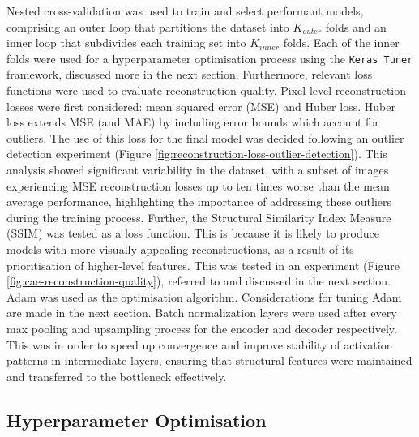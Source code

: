 \documentclass[10pt,twocolumn,letterpaper]{article}
\begin{document}
Nested cross-validation was used to train and select performant models, comprising an outer loop that partitions the dataset into $K_{outer}$ folds and an inner loop that subdivides each training set into $K_{inner}$ folds. Each of the inner folds were used for a hyperparameter optimisation process using the \texttt{Keras Tuner} framework, discussed more in the next section. Furthermore, relevant loss functions were used to evaluate reconstruction quality. Pixel-level reconstruction losses were first considered: mean squared error (MSE) and Huber loss. Huber loss extends MSE (and MAE) by including error bounds which account for outliers. The use of this loss for the final model was decided following an outlier detection experiment (Figure \ref{fig:reconstruction-loss-outlier-detection}). This analysis showed significant variability in the dataset, with a subset of images experiencing MSE reconstruction losses up to ten times worse than the mean average performance, highlighting the importance of addressing these outliers during the training process. Further, the Structural Similarity Index Measure (SSIM) was tested as a loss function. This is because it is likely to produce models with more visually appealing reconstructions, as a result of its prioritisation of higher-level features. This was tested in an experiment (Figure \ref{fig:cae-reconstruction-quality}), referred to and discussed in the next section. Adam was used as the optimisation algorithm. Considerations for tuning Adam are made in the next section. Batch normalization layers were used after every max pooling and upsampling process for the encoder and decoder respectively. This was in order to speed up convergence and improve stability of activation patterns in intermediate layers, ensuring that structural features were maintained and transferred to the bottleneck effectively.

\subsection{Hyperparameter Optimisation}
\end{document}
